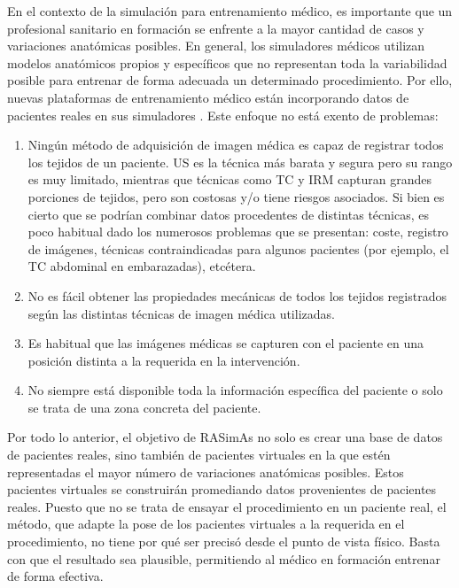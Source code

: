 En el contexto de la simulación para entrenamiento médico, es importante que un profesional sanitario en formación se enfrente a la mayor cantidad de casos y  variaciones anatómicas posibles. En general, los simuladores médicos utilizan modelos anatómicos propios y específicos que no representan toda la variabilidad posible para entrenar de forma adecuada un determinado procedimiento. 
Por ello, nuevas plataformas de entrenamiento médico están incorporando datos de pacientes reales en sus simuladores \cite{Votta2013, ZHANG2017599}. Este enfoque no está exento de problemas:
\begin{enumerate}
    \item Ningún método de adquisición de imagen médica es capaz de registrar todos los tejidos de un paciente.
    \ac{US} es la técnica más barata y segura pero su rango es muy limitado, mientras que técnicas como \ac{TC} y \ac{IRM} capturan grandes porciones de tejidos, pero son costosas y/o tiene riesgos asociados. 
    Si bien es cierto que se podrían combinar datos procedentes de distintas técnicas, es poco habitual dado  los numerosos problemas que se presentan: coste, registro de imágenes, técnicas contraindicadas para algunos pacientes (por ejemplo, el \ac{TC} abdominal en embarazadas), etcétera.
    \item No es fácil obtener las propiedades mecánicas  de todos los tejidos registrados según las distintas técnicas de imagen médica utilizadas.
    \item Es habitual que las imágenes médicas se capturen con el paciente en una posición distinta a la requerida en la intervención.
    \item No siempre está disponible toda la información específica del paciente o solo se trata de una zona concreta del paciente.
\end{enumerate}
%
Por todo lo anterior, el objetivo de \ac{RASimAs} no solo es crear una base de datos de pacientes reales, sino también de pacientes virtuales en la que estén representadas el mayor número de variaciones anatómicas posibles. Estos pacientes virtuales se construirán promediando datos provenientes de pacientes reales. Puesto que no se trata de ensayar el procedimiento en un paciente real, el método, que adapte la pose de los pacientes virtuales a la requerida en el procedimiento, no tiene por qué ser precisó desde el punto de vista físico. Basta con que el resultado sea plausible, permitiendo al médico en formación entrenar de forma efectiva.
